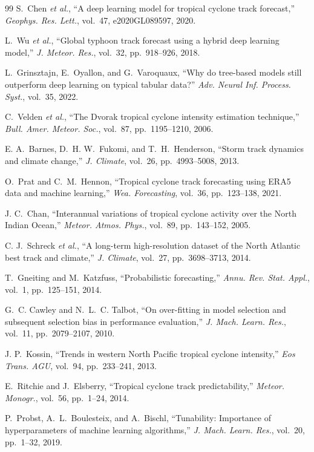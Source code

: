 \documentclass[conference]{IEEEtran}
\begin{document}
\begin{thebibliography}{99}
S.~Chen \textit{et al.}, ``A deep learning model for tropical cyclone track forecast,'' \textit{Geophys. Res. Lett.}, vol.~47, e2020GL089597, 2020.

L.~Wu \textit{et al.}, ``Global typhoon track forecast using a hybrid deep learning model,'' \textit{J. Meteor. Res.}, vol.~32, pp.~918--926, 2018.

L.~Grinsztajn, E.~Oyallon, and G.~Varoquaux, ``Why do tree-based models still outperform deep learning on typical tabular data?'' \textit{Adv. Neural Inf. Process. Syst.}, vol.~35, 2022.

C.~Velden \textit{et al.}, ``The Dvorak tropical cyclone intensity estimation technique,'' \textit{Bull. Amer. Meteor. Soc.}, vol.~87, pp.~1195--1210, 2006.

E. A.~Barnes, D.~H. W.~Fukomi, and T.~H.~Henderson, ``Storm track dynamics and climate change,'' \textit{J. Climate}, vol.~26, pp.~4993--5008, 2013.

O.~Prat and C.~M.~Hennon, ``Tropical cyclone track forecasting using ERA5 data and machine learning,'' \textit{Wea. Forecasting}, vol.~36, pp.~123--138, 2021.

J. C.~Chan, ``Interannual variations of tropical cyclone activity over the North Indian Ocean,'' \textit{Meteor. Atmos. Phys.}, vol.~89, pp.~143--152, 2005.

C. J.~Schreck \textit{et al.}, ``A long-term high-resolution dataset of the North Atlantic best track and climate,'' \textit{J. Climate}, vol.~27, pp.~3698--3713, 2014.

T.~Gneiting and M.~Katzfuss, ``Probabilistic forecasting,'' \textit{Annu. Rev. Stat. Appl.}, vol.~1, pp.~125--151, 2014.

G.~C. Cawley and N.~L.~C. Talbot, ``On over-fitting in model selection and subsequent selection bias in performance evaluation,'' \textit{J. Mach. Learn. Res.}, vol.~11, pp.~2079--2107, 2010.

J. P.~Kossin, ``Trends in western North Pacific tropical cyclone intensity,'' \textit{Eos Trans. AGU}, vol.~94, pp.~233--241, 2013.

E.~Ritchie and J.~Elsberry, ``Tropical cyclone track predictability,'' \textit{Meteor. Monogr.}, vol.~56, pp.~1--24, 2014.

P.~Probst, A.~L.~Boulesteix, and A.~Bischl, ``Tunability: Importance of hyperparameters of machine learning algorithms,'' \textit{J. Mach. Learn. Res.}, vol.~20, pp.~1--32, 2019.


\end{thebibliography}
\end{document}
